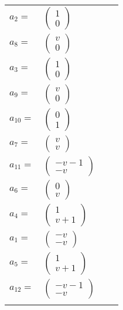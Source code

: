 \documentclass[1p]{elsarticle_modified}
\theoremstyle{definition}
\begin{document}
\begin{tabular}{m{7pt} m{180pt} m{7pt} m{180pt} }
\flushright $a_{2}=$&$\begin{pmatrix}1\\0\end{pmatrix}$ \\
\flushright $a_{8}=$&$\begin{pmatrix}v\\0\end{pmatrix}$ \\
\flushright $a_{3}=$&$\begin{pmatrix}1\\0\end{pmatrix}$ \\
\flushright $a_{9}=$&$\begin{pmatrix}v\\0\end{pmatrix}$ \\
\flushright $a_{10}=$&$\begin{pmatrix}0\\1\end{pmatrix}$ \\
\flushright $a_{7}=$&$\begin{pmatrix}v\\v\end{pmatrix}$ \\
\flushright $a_{11}=$&$\begin{pmatrix}- v-1\\- v\end{pmatrix}$ \\
\flushright $a_{6}=$&$\begin{pmatrix}0\\v\end{pmatrix}$ \\
\flushright $a_{4}=$&$\begin{pmatrix}1\\v+1\end{pmatrix}$ \\
\flushright $a_{1}=$&$\begin{pmatrix}- v\\- v\end{pmatrix}$ \\
\flushright $a_{5}=$&$\begin{pmatrix}1\\v+1\end{pmatrix}$ \\
\flushright $a_{12}=$&$\begin{pmatrix}- v-1\\- v\end{pmatrix}$\\&\end{tabular}
\end{document}

